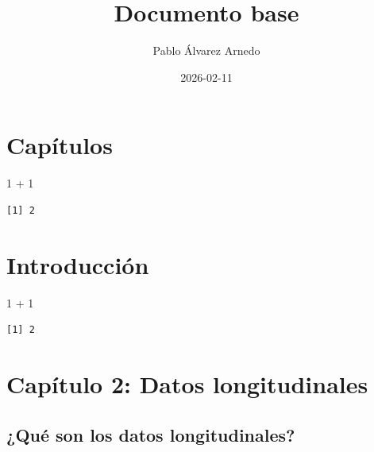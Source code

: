 \documentclass[
  letterpaper,
  DIV=11,
  numbers=noendperiod]{scrreprt}
\title{Documento base}
\author{Pablo Álvarez Arnedo}
\date{2026-02-11}
\newenvironment{Shaded}{\begin{snugshade}}{\end{snugshade}}
\newcommand{\DecValTok}[1]{\textcolor[rgb]{0.68,0.00,0.00}{#1}}
\newcommand{\SpecialCharTok}[1]{\textcolor[rgb]{0.37,0.37,0.37}{#1}}
\renewcommand*\contentsname{Table of contents}
\newcommand\contentsname{Table of contents}
\begin{document}
\maketitle

\renewcommand*\contentsname{Table of contents}
{
\hypersetup{linkcolor=}
\setcounter{tocdepth}{2}
\tableofcontents
}

\chapter*{Capítulos}\label{capuxedtulos}


\begin{Shaded}
\begin{Highlighting}[]
\DecValTok{1} \SpecialCharTok{+} \DecValTok{1}
\end{Highlighting}
\end{Shaded}

\begin{verbatim}
[1] 2
\end{verbatim}


\chapter{Introducción}\label{introducciuxf3n}

\begin{Shaded}
\begin{Highlighting}[]
\DecValTok{1} \SpecialCharTok{+} \DecValTok{1}
\end{Highlighting}
\end{Shaded}

\begin{verbatim}
[1] 2
\end{verbatim}


\chapter{Capítulo 2: Datos
longitudinales}\label{capuxedtulo-2-datos-longitudinales}

\section{¿Qué son los datos
longitudinales?}\label{quuxe9-son-los-datos-longitudinales}
\end{document}
